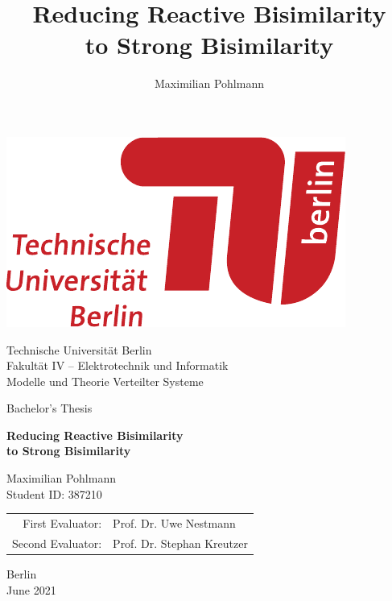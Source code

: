\documentclass[11pt,a4paper,openany]{book}
\begin{document}
\title{Reducing Reactive Bisimilarity\\to Strong Bisimilarity}
\author{Maximilian Pohlmann}

\begin{titlepage}
\begin{center}
    \includegraphics[scale=.2]{TU_Logo}

    \vspace{3.5em}

    {\sc\large 
        {\LARGE Technische Universität Berlin}\\
        {Fakultät IV --  Elektrotechnik und Informatik}\\
        {Modelle und Theorie Verteilter Systeme}

        \vspace{4em}

        {Bachelor's Thesis}

        \vspace{1.5em}

        {\huge\upshape\bf Reducing Reactive Bisimilarity\\[.25em]
        to Strong Bisimilarity}

        \vspace{3em}

        {\Large Maximilian Pohlmann}\\
        {Student ID: 387210}

        \vfill

        {\normalsize
            \begin{tabular}{r l}
                First Evaluator: & Prof. Dr. Uwe Nestmann \\
                Second Evaluator: & Prof. Dr. Stephan Kreutzer
            \end{tabular}
        }

        \vspace{3em}

        Berlin\\
        June 2021
    }
\end{center}
\end{titlepage}
\end{document}
